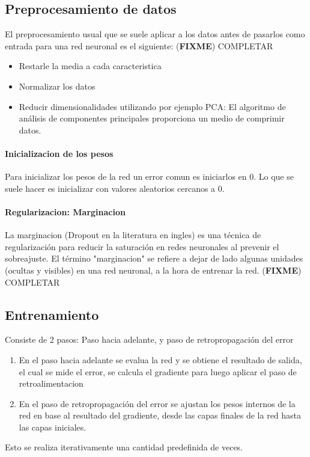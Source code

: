 \documentclass[a4paper,11pt,spanish]{book}
\newcommand*{\FIXME}[1]{{(\textbf{FIXME}) {#1}}}
\begin{document}
    \subsection {Preprocesamiento de datos}
      El preprocesamiento usual que se suele aplicar a los datos antes de pasarlos como entrada para una red neuronal es el siguiente: 
      \FIXME{COMPLETAR}
      \begin{itemize}
       \item Restarle la media a cada caracteristica 
       \item Normalizar los datos
       \item Reducir dimensionalidades utilizando por ejemplo PCA: El algoritmo de análisis de componentes principales proporciona un medio de comprimir datos.
      \end{itemize}

    \paragraph {Inicializacion de los pesos}
      Para inicializar los pesos de la red un error comun es iniciarlos en 0. Lo que se suele hacer es inicializar con valores aleatorios cercanos a 0. 

    \paragraph {Regularizacion: Marginacion}
      La marginacion (Dropout en la literatura en ingles) es una técnica de regularización para reducir la saturación en redes neuronales al prevenir el sobreajuste. 
      El término "marginacion" se refiere a dejar de lado algunas unidades (ocultas y visibles) en una red neuronal, a la hora de entrenar la red.
      \FIXME{COMPLETAR}

    \subsection {Entrenamiento}
      Consiste de 2 pasos: Paso hacia adelante, y paso de retropropagación del error
      \begin{enumerate}
	\item En el paso hacia adelante se evalua la red y se obtiene el resultado de salida, el cual se mide el error, se calcula el gradiente para luego aplicar el paso de retroalimentacion
	\item En el paso de retropropagación del error se ajustan los pesos internos de la red en base al resultado del gradiente, desde las capas finales de la red hasta las capas iniciales.
      \end{enumerate}
      Esto se realiza iterativamente una cantidad predefinida de veces.
\end{document}
